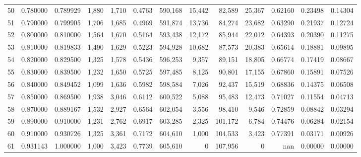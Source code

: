 \begin{tabular}{rrrrrrrrrrrrr}
50 &  0.780000 &  0.789929 &   1,880 &  1,710 &                                     0.4763 &  590,168 &   15,442 &   82,589 &   25,367 &  0.62160 &  0.23498 &  0.14304 \\
51 &  0.790000 &  0.799905 &   1,706 &  1,685 &                                     0.4969 &  591,874 &   13,736 &   84,274 &   23,682 &  0.63290 &  0.21937 &  0.12724 \\
52 &  0.800000 &  0.810000 &   1,564 &  1,670 &                                     0.5164 &  593,438 &   12,172 &   85,944 &   22,012 &  0.64393 &  0.20390 &  0.11275 \\
53 &  0.810000 &  0.819833 &   1,490 &  1,629 &                                     0.5223 &  594,928 &   10,682 &   87,573 &   20,383 &  0.65614 &  0.18881 &  0.09895 \\
54 &  0.820000 &  0.829500 &   1,325 &  1,578 &                                     0.5436 &  596,253 &    9,357 &   89,151 &   18,805 &  0.66774 &  0.17419 &  0.08667 \\
55 &  0.830000 &  0.839500 &   1,232 &  1,650 &                                     0.5725 &  597,485 &    8,125 &   90,801 &   17,155 &  0.67860 &  0.15891 &  0.07526 \\
56 &  0.840000 &  0.849452 &   1,099 &  1,636 &                                     0.5982 &  598,584 &    7,026 &   92,437 &   15,519 &  0.68836 &  0.14375 &  0.06508 \\
57 &  0.850000 &  0.869500 &   1,938 &  3,046 &                                     0.6112 &  600,522 &    5,088 &   95,483 &   12,473 &  0.71027 &  0.11554 &  0.04713 \\
58 &  0.870000 &  0.889167 &   1,532 &  2,927 &                                     0.6564 &  602,054 &    3,556 &   98,410 &    9,546 &  0.72859 &  0.08842 &  0.03294 \\
59 &  0.890000 &  0.910000 &   1,231 &  2,762 &                                     0.6917 &  603,285 &    2,325 &  101,172 &    6,784 &  0.74476 &  0.06284 &  0.02154 \\
60 &  0.910000 &  0.930726 &   1,325 &  3,361 &                                     0.7172 &  604,610 &    1,000 &  104,533 &    3,423 &  0.77391 &  0.03171 &  0.00926 \\
61 &  0.931143 &  1.000000 &   1,000 &  3,423 &                                     0.7739 &  605,610 &        0 &  107,956 &        0 &      nan &  0.00000 &  0.00000 \\
\bottomrule
\end{tabular}
